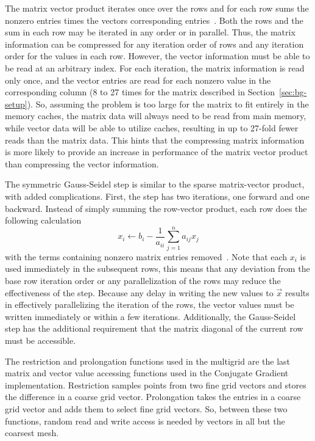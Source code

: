 The matrix vector product iterates once over the rows and for each row sums the nonzero entries times the vectors corresponding entries~\cite{Dongarra:2015:HPCG}.
Both the rows and the sum in each row may be iterated in any order or in parallel.
Thus, the matrix information can be compressed for any iteration order of rows and any iteration order for the values in each row.
However, the vector information must be able to be read at an arbitrary index.
For each iteration, the matrix information is read only once, and the vector entries are read for each nonzero value in the corresponding column (8 to 27 times for the matrix described in Section~\ref{sec:bg-setup}).
So, assuming the problem is too large for the matrix to fit entirely in the memory caches, the matrix data will always need to be read from main memory, while vector data will be able to utilize caches, resulting in up to 27-fold fewer reads than the matrix data.
This hints that the compressing matrix information is more likely to provide an increase in performance of the matrix vector product than compressing the vector information.

The symmetric Gauss-Seidel step is similar to the sparse matrix-vector product, with added complications.
First, the step has two iterations, one forward and one backward.
Instead of simply summing the row-vector product, each row does the following calculation
\[
	x_i \gets b_i - \frac{1}{a_{ii}}\sum_{j=1}^{n}a_{ij}x_j
\]
with the terms containing nonzero matrix entries removed~\cite{Dongarra:2015:HPCG}.
Note that each \(x_i\) is used immediately in the subsequent rows, this means that any deviation from the base row iteration order or any parallelization of the rows may reduce the effectiveness of the step.
Because any delay in writing the new values to \(\vec{x}\) results in effectively parallelizing the iteration of the rows, the vector values must be written immediately or within a few iterations.
Additionally, the Gauss-Seidel step has the additional requirement that the matrix diagonal of the current row must be accessible.

The restriction and prolongation functions used in the multigrid are the last matrix and vector value accessing functions used in the Conjugate Gradient implementation.
Restriction samples points from two fine grid vectors and stores the difference in a coarse grid vector.
Prolongation takes the entries in a coarse grid vector and adds them to select fine grid vectors.
So, between these two functions, random read and write access is needed by vectors in all but the coarsest mesh.


